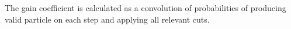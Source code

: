\documentclass[utf8]{webofc}
\begin{document}
    
    
    
    
    
    The gain coefficient is calculated as a convolution of probabilities of producing valid particle on each step and applying all relevant cuts.
    
\end{document}
